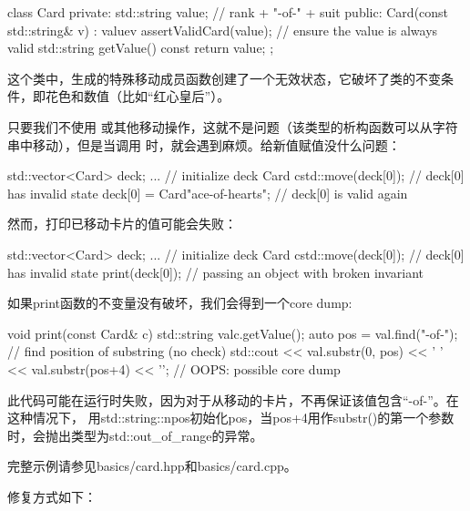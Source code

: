 \begin{cppcode}
class Card {
private:
	std::string value; // rank + "-of-" + suit
public:
	Card(const std::string& v)
	: value{v} {
		assertValidCard(value); // ensure the value is always valid
	}
	std::string getValue() const {
		return value;
	}
};
\end{cppcode}

这个类中，生成的特殊移动成员函数创建了一个无效状态，它破坏了类的不变条件，即花色和数值（比如“红心皇后”）。

只要我们不使用  或其他移动操作，这就不是问题（该类型的析构函数可以从字符串中移动），但是当调用  时，就会遇到麻烦。给新值赋值没什么问题：

\begin{cppcode}
std::vector<Card> deck;
... // initialize deck
Card c{std::move(deck[0])}; // deck[0] has invalid state
deck[0] = Card{"ace-of-hearts"}; // deck[0] is valid again
\end{cppcode}

然而，打印已移动卡片的值可能会失败：

\begin{cppcode}
std::vector<Card> deck;
... // initialize deck
Card c{std::move(deck[0])}; // deck[0] has invalid state
print(deck[0]); // passing an object with broken invariant
\end{cppcode}

如果print函数的不变量没有破坏，我们会得到一个core dump:

\begin{cppcode}
void print(const Card& c) {
	std::string val{c.getValue()};
	auto pos = val.find("-of-"); // find position of substring (no check)
	std::cout << val.substr(0, pos) << ' '
	<< val.substr(pos+4) << '\n'; // OOPS: possible core dump
}
\end{cppcode}

此代码可能在运行时失败，因为对于从移动的卡片，不再保证该值包含“-of-”。在这种情况下， 用std::string::npos初始化pos，当pos+4用作substr()的第一个参数时，会抛出类型为std::out_of_range的异常。

完整示例请参见basics/card.hpp和basics/card.cpp。

修复方式如下：

